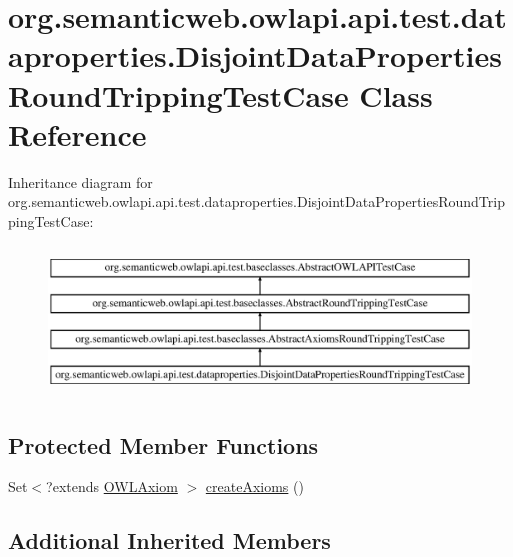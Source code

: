 \hypertarget{classorg_1_1semanticweb_1_1owlapi_1_1api_1_1test_1_1dataproperties_1_1_disjoint_data_properties_round_tripping_test_case}{\section{org.\-semanticweb.\-owlapi.\-api.\-test.\-dataproperties.\-Disjoint\-Data\-Properties\-Round\-Tripping\-Test\-Case Class Reference}
\label{classorg_1_1semanticweb_1_1owlapi_1_1api_1_1test_1_1dataproperties_1_1_disjoint_data_properties_round_tripping_test_case}
}
Inheritance diagram for org.\-semanticweb.\-owlapi.\-api.\-test.\-dataproperties.\-Disjoint\-Data\-Properties\-Round\-Tripping\-Test\-Case\-:\begin{figure}[H]
\begin{center}
\leavevmode
\includegraphics[height=4.000000cm]{classorg_1_1semanticweb_1_1owlapi_1_1api_1_1test_1_1dataproperties_1_1_disjoint_data_properties_round_tripping_test_case}
\end{center}
\end{figure}
\subsection*{Protected Member Functions}
\begin{DoxyCompactItemize}
\item 
Set$<$?extends \hyperlink{interfaceorg_1_1semanticweb_1_1owlapi_1_1model_1_1_o_w_l_axiom}{O\-W\-L\-Axiom} $>$ \hyperlink{classorg_1_1semanticweb_1_1owlapi_1_1api_1_1test_1_1dataproperties_1_1_disjoint_data_properties_round_tripping_test_case_adea2848ddd6aed926bcc5a9cb2c3e6ad}{create\-Axioms} ()
\end{DoxyCompactItemize}
\subsection*{Additional Inherited Members}


